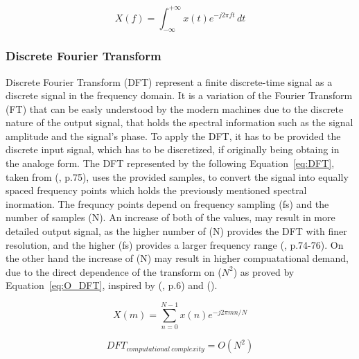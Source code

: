     \begin{equation}
    \label{eq:FT}
    X(f) = \int_{-\infty}^{+\infty} x(t) e^{-j 2\pi f t} \, dt
    \end{equation}

    \subsubsection{Discrete Fourier Transform}
    \label{sec:FFT}
    Discrete Fourier Transform (DFT) represent a finite discrete-time signal as a discrete signal in the frequency domain. It is a variation of the Fourier Transform (FT) that can be easly understood by the modern machines due to the discrete nature of the output signal, that holds the spectral information such as the signal amplitude and the signal's phase. To apply the DFT, it has to be provided the discrete input signal, which has to be discretized, if originally being obtaing in the analoge form. The DFT represented by the following Equation~\ref{eq:DFT}, taken from (\cite{understanding_dsp}, p.75), uses the provided samples, to convert the signal into equally spaced frequency points which holds the previously mentioned spectral inormation. The frequncy points depend on frequency sampling (fs) and the number of samples (N). An increase of both of the values, may result in more detailed output signal, as the higher number of (N) provides the DFT with finer resolution, and the higher (fs) provides a larger frequency range (\cite{understanding_dsp}, p.74-76). On the other hand the increase of (N) may result in higher compuatational demand, due to the direct dependence of the transform on ($N^2$) as proved by Equation~\ref{eq:O_DFT}, inspired by (\cite{oppenheim_dft_lecture}, p.6) and (\cite{moler_eddins_fft}).

    \begin{equation}
    \label{eq:DFT}
        X(m) = \sum_{n=0}^{N-1} x(n) e^{-j 2\pi mn / N}
    \end{equation}

    \begin{equation}
        \label{eq:O_DFT}
        DFT_{computational \ complexity } = O(N^2)
    \end{equation}
